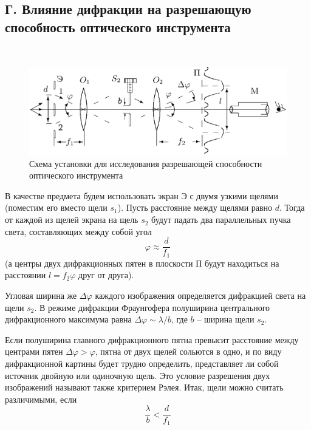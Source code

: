 \documentclass[12pt]{article}
\begin{document}
    \subsection*{Г. Влияние дифракции на разрешающую способность оптического инструмента}
    \ \par
    \begin{figure}[h]
        \centering
        \includegraphics[width=\linewidth]{pic/setupD}
        \caption{Схема установки для исследования разрешающей способности оптического инструмента}
        \label{fig:4}
    \end{figure}
    В качестве предмета будем использовать экран Э с двумя узкими щелями (поместим
    его вместо щели $s_1$). Пусть расстояние между щелями равно $d$. Тогда от каждой из щелей
    экрана на щель $s_2$ будут падать два параллельных пучка света, составляющих между
    собой угол
    \begin{equation}
        \varphi \approx \frac{d}{f_1}
        \label{eq:7}
    \end{equation}
    (а центры двух дифракционных пятен в плоскости П будут находиться на расстоянии
    $l = f_2\varphi$ друг от друга).

    Угловая ширина же $\Delta \varphi$ каждого изображения определяется дифракцией света на щели $s_2$.
    В режиме дифракции Фраунгофера полуширина центрального дифракционного
    максимума равна $\Delta \varphi \sim \lambda/b$, где $b$ -- ширина щели $s_2$.

    Если полуширина главного дифракционного пятна превысит расстояние между центрами пятен $\Delta \varphi > \varphi$,
    пятна от двух щелей сольются в одно, и по виду дифракционной картины будет трудно определить,
    представляет ли собой источник двойную или одиночную щель.
    Это условие разрешения двух изображений называют также критерием Рэлея.
    Итак, щели можно считать различимыми, если
    \begin{equation}
        \frac{\lambda}{b} < \frac{d}{f_1}
        \label{eq:8}
    \end{equation}
\end{document}
